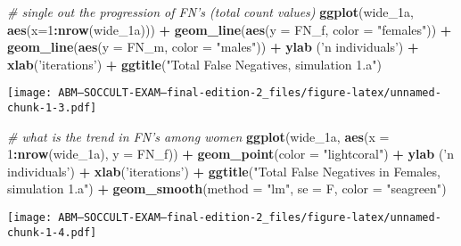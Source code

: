 \documentclass[]{article}
\newenvironment{Shaded}{\begin{snugshade}}{\end{snugshade}}
\newcommand{\KeywordTok}[1]{\textcolor[rgb]{0.13,0.29,0.53}{\textbf{#1}}}
\newcommand{\DataTypeTok}[1]{\textcolor[rgb]{0.13,0.29,0.53}{#1}}
\newcommand{\DecValTok}[1]{\textcolor[rgb]{0.00,0.00,0.81}{#1}}
\newcommand{\StringTok}[1]{\textcolor[rgb]{0.31,0.60,0.02}{#1}}
\newcommand{\CommentTok}[1]{\textcolor[rgb]{0.56,0.35,0.01}{\textit{#1}}}
\newcommand{\OperatorTok}[1]{\textcolor[rgb]{0.81,0.36,0.00}{\textbf{#1}}}
\newcommand{\NormalTok}[1]{#1}
\begin{document}
\begin{Shaded}
\begin{Highlighting}[]
\CommentTok{# single out the progression of FN's (total count values)}
\KeywordTok{ggplot}\NormalTok{(wide_1a, }\KeywordTok{aes}\NormalTok{(}\DataTypeTok{x=}\DecValTok{1}\OperatorTok{:}\KeywordTok{nrow}\NormalTok{(wide_1a))) }\OperatorTok{+}\StringTok{ }
\StringTok{  }\KeywordTok{geom_line}\NormalTok{(}\KeywordTok{aes}\NormalTok{(}\DataTypeTok{y =}\NormalTok{ FN_f, }\DataTypeTok{color =} \StringTok{"females"}\NormalTok{)) }\OperatorTok{+}
\StringTok{  }\KeywordTok{geom_line}\NormalTok{(}\KeywordTok{aes}\NormalTok{(}\DataTypeTok{y =}\NormalTok{ FN_m, }\DataTypeTok{color =} \StringTok{"males"}\NormalTok{)) }\OperatorTok{+}
\StringTok{  }\KeywordTok{ylab}\NormalTok{ (}\StringTok{'n individuals'}\NormalTok{) }\OperatorTok{+}\StringTok{ }\KeywordTok{xlab}\NormalTok{(}\StringTok{'iterations'}\NormalTok{) }\OperatorTok{+}
\StringTok{  }\KeywordTok{ggtitle}\NormalTok{(}\StringTok{"Total False Negatives, simulation 1.a"}\NormalTok{)}
\end{Highlighting}
\end{Shaded}

\texttt{[image: ABM---SOCCULT-EXAM---final-edition-2\_files/figure-latex/unnamed-chunk-1-3.pdf]}

\begin{Shaded}
\begin{Highlighting}[]
\CommentTok{# what is the trend in FN's among women}
  \KeywordTok{ggplot}\NormalTok{(wide_1a, }\KeywordTok{aes}\NormalTok{(}\DataTypeTok{x =} \DecValTok{1}\OperatorTok{:}\KeywordTok{nrow}\NormalTok{(wide_1a), }\DataTypeTok{y =}\NormalTok{ FN_f)) }\OperatorTok{+}\StringTok{ }
\StringTok{  }\KeywordTok{geom_point}\NormalTok{(}\DataTypeTok{color =} \StringTok{"lightcoral"}\NormalTok{) }\OperatorTok{+}
\StringTok{  }\KeywordTok{ylab}\NormalTok{ (}\StringTok{'n individuals'}\NormalTok{) }\OperatorTok{+}\StringTok{ }\KeywordTok{xlab}\NormalTok{(}\StringTok{'iterations'}\NormalTok{) }\OperatorTok{+}
\StringTok{  }\KeywordTok{ggtitle}\NormalTok{(}\StringTok{"Total False Negatives in Females, simulation 1.a"}\NormalTok{) }\OperatorTok{+}
\StringTok{  }\KeywordTok{geom_smooth}\NormalTok{(}\DataTypeTok{method =} \StringTok{"lm"}\NormalTok{, }\DataTypeTok{se =}\NormalTok{ F, }\DataTypeTok{color =} \StringTok{"seagreen"}\NormalTok{)}
\end{Highlighting}
\end{Shaded}

\texttt{[image: ABM---SOCCULT-EXAM---final-edition-2\_files/figure-latex/unnamed-chunk-1-4.pdf]}
\end{document}

